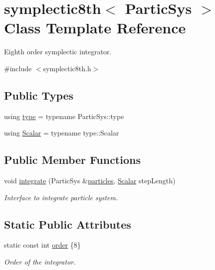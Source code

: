 \hypertarget{classsymplectic8th}{}\section{symplectic8th$<$ Partic\+Sys $>$ Class Template Reference}
\label{classsymplectic8th}


Eighth order symplectic integrator.  




{\ttfamily \#include $<$symplectic8th.\+h$>$}

\subsection*{Public Types}
\begin{DoxyCompactItemize}
\item 
using \mbox{\hyperlink{classsymplectic8th_a9e02e91dadeed454d5e3986f83c489fa}{type}} = typename Partic\+Sys\+::type
\item 
using \mbox{\hyperlink{classsymplectic8th_a3a85c2b58a75f2da56a6989a73a001b8}{Scalar}} = typename type\+::\+Scalar
\end{DoxyCompactItemize}
\subsection*{Public Member Functions}
\begin{DoxyCompactItemize}
\item 
void \mbox{\hyperlink{classsymplectic8th_a6d3406699e9edfe9fe0791821b719fe0}{integrate}} (Partic\+Sys \&\mbox{\hyperlink{classparticles}{particles}}, \mbox{\hyperlink{classsymplectic8th_a3a85c2b58a75f2da56a6989a73a001b8}{Scalar}} step\+Length)
\begin{DoxyCompactList}\small\item\em Interface to integrate particle system. \end{DoxyCompactList}\end{DoxyCompactItemize}
\subsection*{Static Public Attributes}
\begin{DoxyCompactItemize}
\item 
static const int \mbox{\hyperlink{classsymplectic8th_a5f80ae81362e3542cb9ed7653f1b20d6}{order}} \{8\}
\begin{DoxyCompactList}\small\item\em Order of the integrator. \end{DoxyCompactList}\end{DoxyCompactItemize}


